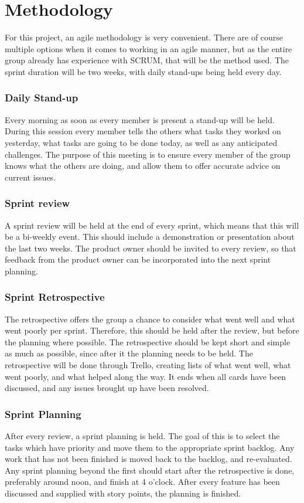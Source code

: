 \section{Methodology}
For this project, an agile methodology is very convenient.
There are of course multiple options when it comes to working in an agile manner, but as the entire group already has experience with SCRUM, that will be the method used.
The sprint duration will be two weeks, with daily stand-ups  being held every day.

\subsubsection{Daily Stand-up}
\label{sec::standup}
Every morning as soon as every member is present a stand-up will be held.
During this session every member tells the others what tasks they worked on yesterday, what tasks are going to be done today, as well as any anticipated challenges.
The purpose of this meeting is to ensure every member of the group knows what the others are doing, and allow them to offer accurate advice on current issues.

\subsubsection{Sprint review}
\label{sec::sprintrev}
A sprint review will be held at the end of every sprint, which means that this will be a bi-weekly event.
This should include a demonstration or presentation about the last two weeks.
The product owner should be invited to every review, so that feedback from the product owner can be incorporated into the next sprint planning.

\subsubsection{Sprint Retrospective}
The retrospective offers the group a chance to consider what went well and what went poorly per sprint.
Therefore, this should be held after the review, but before the planning where possible.
The retrospective should be kept short and simple as much as possible, since after it the planning needs to be held.
The retrospective will be done through Trello, creating lists of what went well, what went poorly, and what helped along the way.
It ends when all cards have been discussed, and any issues brought up have been resolved.

\subsubsection{Sprint Planning}
After every review, a sprint planning is held.
The goal of this is to select the tasks which have priority and move them to the appropriate sprint backlog. 
Any work that has not been finished is moved back to the backlog, and re-evaluated.
Any sprint planning beyond the first should start after the retrospective is done, preferably around noon, and finish at 4 o'clock.
After every feature has been discussed and supplied with story points, the planning is finished.
\newpage

